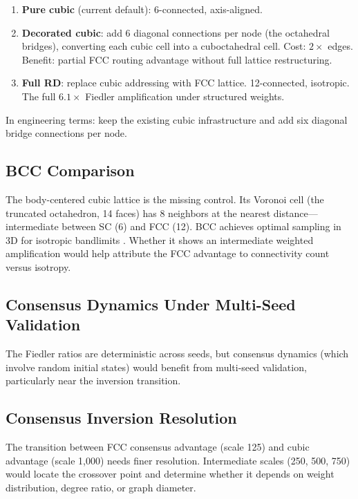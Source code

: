\documentclass[11pt]{article}
\begin{document}
\begin{enumerate}
  \item \textbf{Pure cubic} (current default): 6-connected, axis-aligned.
  \item \textbf{Decorated cubic}: add 6 diagonal connections per
    node (the octahedral bridges), converting each cubic cell into
    a cuboctahedral cell. Cost: $2\times$ edges. Benefit: partial
    FCC routing advantage without full lattice restructuring.
  \item \textbf{Full RD}: replace cubic addressing with FCC
    lattice. 12-connected, isotropic. The full $6.1\times$ Fiedler
    amplification under structured weights.
\end{enumerate}

In engineering terms: keep the existing cubic infrastructure and
add six diagonal bridge connections per node.

\subsection{BCC Comparison}

The body-centered cubic lattice is the missing control. Its Voronoi
cell (the truncated octahedron, 14 faces) has 8 neighbors at the
nearest distance---intermediate between SC (6) and FCC (12). BCC
achieves optimal sampling in 3D for isotropic bandlimits
\cite{petersen1962}. Whether it shows an intermediate weighted
amplification would help attribute the FCC advantage to connectivity
count versus isotropy.

\subsection{Consensus Dynamics Under Multi-Seed Validation}

The Fiedler ratios are deterministic across seeds, but consensus
dynamics (which involve random initial states) would benefit from
multi-seed validation, particularly near the inversion transition.

\subsection{Consensus Inversion Resolution}

The transition between FCC consensus advantage (scale 125) and
cubic advantage (scale 1{,}000) needs finer resolution. Intermediate
scales (250, 500, 750) would locate the crossover point and
determine whether it depends on weight distribution, degree ratio,
or graph diameter.
\end{document}
